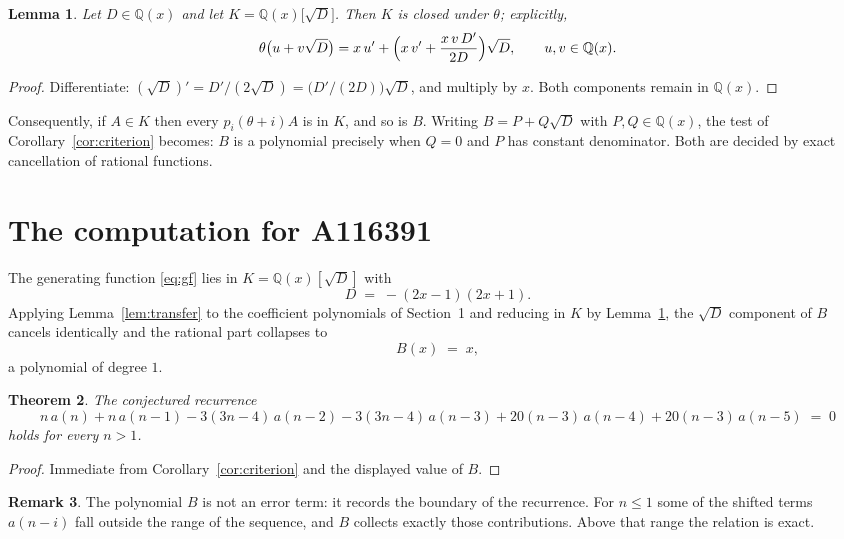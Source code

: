 \documentclass[11pt,a4paper]{article}
\theoremstyle{plain}
\newtheorem{theorem}{Theorem}
\newtheorem{lemma}[theorem]{Lemma}
\theoremstyle{definition}
\newtheorem{remark}[theorem]{Remark}
\begin{document}
\begin{lemma}\label{lem:field}
Let $D\in\mathbb{Q}(x)$ and let $K=\mathbb{Q}(x)\bigl[\sqrt{D}\bigr]$. Then $K$ is closed
under $\theta$; explicitly,
\[
\theta\bigl(u+v\sqrt{D}\bigr)=x\,u'+\Bigl(x\,v'+\frac{x\,v\,D'}{2D}\Bigr)\sqrt{D},
\qquad u,v\in\mathbb{Q}(x).
\]
\end{lemma}

\begin{proof}
Differentiate: $(\sqrt{D})'=D'/(2\sqrt{D})=\bigl(D'/(2D)\bigr)\sqrt{D}$, and multiply by
$x$. Both components remain in $\mathbb{Q}(x)$.
\end{proof}

Consequently, if $A\in K$ then every $p_{i}(\theta+i)A$ is in $K$, and so is $B$. Writing
$B=P+Q\sqrt{D}$ with $P,Q\in\mathbb{Q}(x)$, the test of Corollary~\ref{cor:criterion}
becomes: $B$ is a polynomial precisely when $Q=0$ and $P$ has constant denominator. Both
are decided by exact cancellation of rational functions.

\section{The computation for A116391}

The generating function \eqref{eq:gf} lies in $K=\mathbb{Q}(x)[\sqrt{D}]$ with
\[
D \;=\; - \left(2 x - 1\right) \left(2 x + 1\right) .
\]
Applying Lemma~\ref{lem:transfer} to the coefficient polynomials of Section~1 and reducing
in $K$ by Lemma~\ref{lem:field}, the $\sqrt{D}$ component of $B$ cancels identically and
the rational part collapses to
\[
B(x)\;=\;x ,
\]
a polynomial of degree $1$.

\begin{theorem}
The conjectured recurrence
\[
n\,a(n) + n\,a(n-1) -  3 \left(3 n - 4\right)\,a(n-2) -  3 \left(3 n - 4\right)\,a(n-3) + 20 \left(n - 3\right)\,a(n-4) + 20 \left(n - 3\right)\,a(n-5) \;=\;0
\]
holds for every $n>1$.
\end{theorem}

\begin{proof}
Immediate from Corollary~\ref{cor:criterion} and the displayed value of $B$.
\end{proof}

\begin{remark}
The polynomial $B$ is not an error term: it records the boundary of the recurrence. For
$n\le1$ some of the shifted terms $a(n-i)$ fall outside the range of the sequence,
and $B$ collects exactly those contributions. Above that range the relation is exact.
\end{remark}
\end{document}
